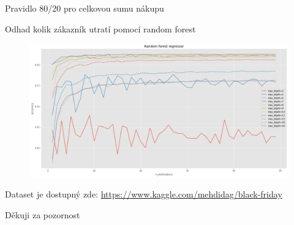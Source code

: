 \documentclass[11pt]{beamer}
\begin{document}
\begin{frame}{Pravidlo 80/20 pro celkovou sumu nákupu}
\begin{figure}
	\hfill
	\hfill
	\hfill
\end{figure}
\end{frame}

\begin{frame}{Odhad kolik zákazník utratí pomocí random forest}
\begin{figure}
	\includegraphics[width=\textwidth,keepaspectratio]{black-friday_43_0}
\end{figure}
\end{frame}

\begin{frame}
Dataset je dostupný zde: \url{https://www.kaggle.com/mehdidag/black-friday}
\end{frame}

\begin{frame}[standout]
Děkuji za pozornost
\end{frame}
\end{document}
